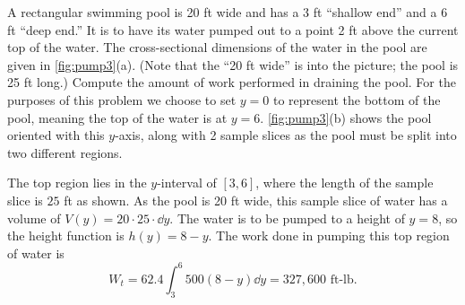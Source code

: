 \begin{example}\label{ex_pump3}%
A rectangular swimming pool is 20 ft wide and has a 3 ft ``shallow end'' and a 6 ft ``deep end.'' It is to have its water pumped out to a point 2 ft above the current top of the water. The cross-sectional dimensions of the water in the pool are given in \autoref{fig:pump3}(a). (Note that the ``20 ft wide'' is into the picture; the pool is 25 ft long.) Compute the amount of work performed in draining the pool.
\solution
For the purposes of this problem we choose to set $y=0$ to represent the bottom of the pool, meaning the top of the water is at $y=6$.
\autoref{fig:pump3}(b) shows the pool oriented with this $y$-axis, along with 2 sample slices as the pool must be split into two different regions. 

The top region lies in the $y$-interval of $[3,6]$, where the length of the sample slice is $25$ ft as shown. As the pool is 20 ft wide, this sample slice of water has a volume of $V(y) = 20\cdot25\cdot\dd y$.  The water is to be pumped to a height of $y=8$, so the height function is $h(y) = 8-y$. The work done in pumping this top region of water is 
\[W_t = 62.4\int_3^6 500(8-y)\dd y = 327,600 \text{ ft-lb}.\]


\end{example}
